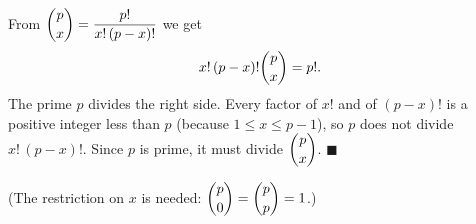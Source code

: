 From $\dbinom px=\dfrac{p!}{x!\,(p-x)!}$ we get
\[x!\,(p-x)!\dbinom px=p!.\]
The prime $p$ divides the right side. Every factor of $x!$ and of $(p-x)!$ is a positive integer less than $p$ (because $1\le x\le p-1$), so $p$ does not divide $x!\,(p-x)!$. Since $p$ is prime, it must divide $\dbinom px$. $\blacksquare$

(The restriction on $x$ is needed: $\dbinom p0=\dbinom pp=1$.)
